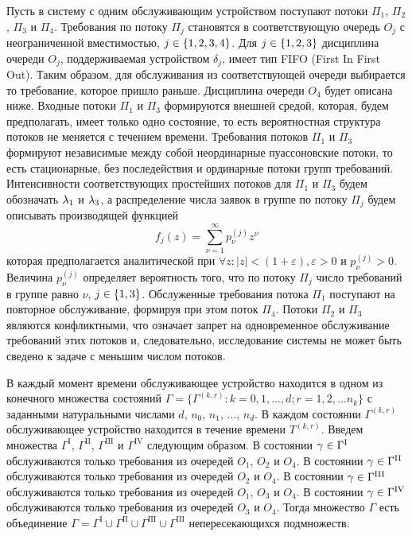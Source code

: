 \documentclass[a4paper,12pt,russian]{extarticle}
\newcommand{\G}{\Gamma}
\newcommand{\ga}[1]{\Gamma^{\left( #1 \right)} }
\newcommand{\Tt}[1]{T^{\left( #1 \right)} }
\begin{document}
Пусть в систему с одним обслуживающим устройством поступают потоки $\Pi_1$, $\Pi_2$, $\Pi_3$  и $\Pi_4$. Требования по потоку $\Pi_j$ становятся в соответствующую очередь $O_j$ с неограниченной вместимостью, $j\in \left\{1, 2, 3, 4\right\}$. Для $j \in \left\{1, 2, 3\right\}$ дисциплина очереди $O_j$, поддерживаемая устройством $\delta_j$, имеет тип FIFO (First In First Out). Таким образом, для обслуживания из соответствующей очереди выбирается то требование, которое пришло раньше. Дисциплина очереди $O_4$ будет описана ниже. Входные потоки $\Pi_1$ и $\Pi_3$ формируются внешней средой, которая, будем предполагать, имеет только одно состояние, то есть вероятностная структура потоков не меняется с течением времени. Требования потоков $\Pi_1$ и $\Pi_3$ формируют независимые между собой неординарные пуассоновские потоки, то есть  стационарные, без последействия и ординарные потоки групп требований. Интенсивности соответствующих простейших потоков для $\Pi_1$ и $\Pi_3$ будем обозначать $\lambda_1$ и $\lambda_3$, а распределение числа заявок в группе по потоку $\Pi_j$ будем описывать производящей функцией
\begin{equation}
f_j(z) = \sum_{\nu=1}^{\infty} p_{\nu}^{(j)} z ^{\nu}
\label{GeneratingFunc}
\end{equation}
которая предполагается аналитической при $\forall z \colon |z|<(1+\varepsilon), \varepsilon > 0$ и $p_{\nu}^{(j)}>0$. Величина $p_{\nu}^{(j)}$ определяет вероятность того, что по потоку $\Pi_j$ число требований в группе равно $\nu$, $j\in \left\{1,3\right\}$. Обслуженные требования потока $\Pi_1$ поступают на повторное обслуживание, формируя при этом поток $\Pi_4$. Потоки $\Pi_2$ и $\Pi_3$ являются конфликтными, что означает запрет на одновременное обслуживание требований этих потоков и, следовательно, исследование системы не может быть сведено к задаче с меньшим числом потоков. 
 
 В каждый момент времени обслуживающее устройство находится в одном из конечного множества состояний $\Gamma=\{\G^{(k,r)} \colon k=0,1,\ldots,d; r=1,2,\ldots n_k\}$ с заданными натуральными числами $d$, $n_0$, $n_1$, $\ldots$, $n_d$. В каждом состоянии $\ga{k,r}$ обслуживающее устройство находится в течение времени $\Tt{k,r}$. Введем множества $\G^{\mathrm{I}}$, $\G^{\mathrm{II}}$, $\G^{\mathrm{III}}$ и $\G^{\mathrm{IV}}$ следующим образом. В состоянии $\gamma \in \G^{\mathrm{\Rmnum{1}}}$ обслуживаются только требования из очередей $O_1$, $O_2$ и $O_4$.
В состоянии $\gamma \in \G^{\mathrm{\Rmnum{2}}}$ обслуживаются только требования из очередей $O_2$ и $O_4$.
В состоянии $\gamma \in \G^{\mathrm{\Rmnum{3}}}$ обслуживаются только требования из очередей $O_1$, $O_3$ и $O_4$.
В состоянии $\gamma \in \G^{\mathrm{\Rmnum{4}}}$ обслуживаются только требования из очередей $O_3$ и $O_4$.
Тогда множество $\G$ есть объединение $\G = \G^{\mathrm{I}} \cup \G^{\mathrm{II}} \cup \G^{\mathrm{III}} \cup \G^{\mathrm{III}}$ непересекающихся подмножеств. 
\end{document}
